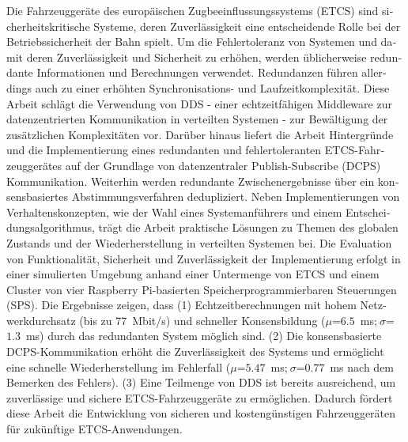 \null\vfil
\begin{otherlanguage}{ngerman}
\begin{center}\textsf{\textbf{\abstractname}}\end{center}

\noindent 
Die Fahrzeuggeräte des europäischen Zugbeeinflussungssystems (ETCS) sind sicherheitskritische Systeme, deren Zuverlässigkeit eine entscheidende Rolle bei der Betriebssicherheit der Bahn spielt.
Um die Fehlertoleranz von Systemen und damit deren Zuverlässigkeit und Sicherheit zu erhöhen, werden üblicherweise redundante Informationen und Berechnungen verwendet.
Redundanzen führen allerdings auch zu einer erhöhten Synchronisations- und Laufzeitkomplexität.
Diese Arbeit schlägt die Verwendung von DDS - einer echtzeitfähigen Middleware zur datenzentrierten Kommunikation in verteilten Systemen - zur Bewältigung der zusätzlichen Komplexitäten vor.
Darüber hinaus liefert die Arbeit Hintergründe und die Implementierung eines redundanten und fehlertoleranten ETCS-Fahrzeuggerätes auf der Grundlage von datenzentraler Publish-Subscribe (DCPS) Kommunikation.
Weiterhin werden redundante Zwischenergebnisse über ein konsensbasiertes Abstimmungsverfahren dedupliziert.
Neben Implementierungen von Verhaltenskonzepten, wie der Wahl eines Systemanführers und einem Entscheidungsalgorithmus, trägt die Arbeit praktische Lösungen zu Themen des globalen Zustands und der Wiederherstellung in verteilten Systemen bei.
Die Evaluation von Funktionalität, Sicherheit und Zuverlässigkeit der Implementierung erfolgt in einer simulierten Umgebung anhand einer Untermenge von ETCS und einem Cluster von vier Raspberry Pi-basierten Speicherprogrammierbaren Steuerungen (SPS).
Die Ergebnisse zeigen, dass (1) Echtzeitberechnungen mit hohem Netzwerkdurchsatz (bis zu 77~Mbit/s) und schneller Konsensbildung ($\mu$=$6.5$~ms;$~\sigma$=$1.3$~ms) durch das redundanten System möglich sind.
(2) Die konsensbasierte DCPS-Kommunikation erhöht die Zuverlässigkeit des Systems und ermöglicht eine schnelle Wiederherstellung im Fehlerfall ($\mu$=$5.47$~ms;$~\sigma$=$0.77$~ms nach dem Bemerken des Fehlers).
(3) Eine Teilmenge von DDS ist bereits ausreichend, um zuverlässige und sichere ETCS-Fahrzeuggeräte zu ermöglichen.
Dadurch fördert diese Arbeit die Entwicklung von sicheren und kostengünstigen Fahrzeuggeräten für zukünftige ETCS-Anwendungen.

\end{otherlanguage}
\vfil\null


